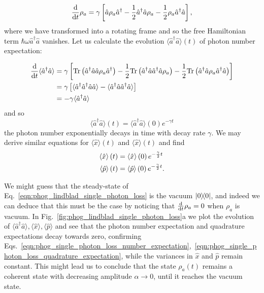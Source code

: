 \begin{equation}\label{eqn:phog_lindblad_single_photon_loss}
\frac{\mathrm{d}}{\mathrm{d}t} \rho_a = \gamma\left[\hat{a}\rho_a \hat{a}^\dagger - \frac{1}{2} \hat{a}^\dagger \hat{a} \rho_a - \frac{1}{2} \rho_a \hat{a}^\dagger \hat{a}\right],
\end{equation}
where we have transformed into a rotating frame and so the free Hamiltonian term $\hbar \omega \hat{a}^\dagger \hat{a}$ vanishes. Let us calculate the evolution $\langle \hat{a}^\dagger \hat{a}\rangle\left(t\right)$ of photon number expectation:

\begin{align}
\ddt \langle \hat{a}^\dagger \hat{a}\rangle &= \gamma \left[ \text{Tr}\left(\hat{a}^\dagger \hat{a} \hat{a} \rho_a \hat{a}^\dagger \right) - \frac{1}{2} \text{Tr}\left(\hat{a}^\dagger \hat{a} \hat{a}^\dagger \hat{a} \rho_a\right) - \frac{1}{2} \text{Tr}\left(\hat{a}^\dagger \hat{a} \rho_a \hat{a}^\dagger \hat{a}\right)\right] \notag \\
%
&= \gamma \left[ \langle \hat{a}^\dagger \hat{a}^\dagger \hat{a}\hat{a}\rangle - \langle \hat{a}^\dagger \hat{a} \hat{a}^\dagger \hat{a}\rangle \right] \notag \\
%
&= - \gamma \langle \hat{a}^\dagger \hat{a}\rangle
\end{align}
\noindent and so
\begin{equation}\label{eqn:phog_single_photon_loss_number_expectation}
\langle\hat{a}^\dagger \hat{a} \rangle \left(t\right) = \langle \hat{a}^\dagger \hat{a}\rangle \left(0\right) e^{- \gamma t}
\end{equation}
the photon number exponentially decays in time with decay rate $\gamma$. We may derive similar equations for $\langle\hat{x}\rangle\left(t\right)$ and $\langle\hat{x}\rangle\left(t\right)$ and find 
\begin{align}\label{eqn:phog_single_photon_loss_quadrature_expectation}
 \langle \hat{x}\rangle\left(t\right) &= \langle \hat{x}\rangle\left(0\right) e^{- \frac{\gamma}{2} t} \notag \\
%
 \langle \hat{p}\rangle\left(t\right) &= \langle \hat{p}\rangle \left(0\right) e^{- \frac{\gamma}{2} t}.
\end{align}

\noindent We might guess that the steady-state of Eq.~\ref{eqn:phog_lindblad_single_photon_loss} is the vacuum $\dyad{0}$, and indeed we can deduce that this must be the case by noticing that $\frac{\mathrm{d}}{\mathrm{d}t} \rho_a = 0$ when $\rho_a$ is vacuum. In Fig.~\ref{fig:phog_lindblad_single_photon_loss}a we plot the evolution of $\langle\hat{a}^\dagger \hat{a}\rangle, \langle \hat{x}\rangle, \langle \hat{p}\rangle$ and see that the photon number expectation and quadrature expectations decay towards zero, confirming Eqs.~\ref{eqn:phog_single_photon_loss_number_expectation},~\ref{eqn:phog_single_photon_loss_quadrature_expectation}, while the variances in $\hat{x}$ and $\hat{p}$ remain constant. This might lead us to conclude that the state $\rho_a\left(t\right)$ remains a coherent state with decreasing amplitude $\alpha\rightarrow0$, until it reaches the vacuum state.

